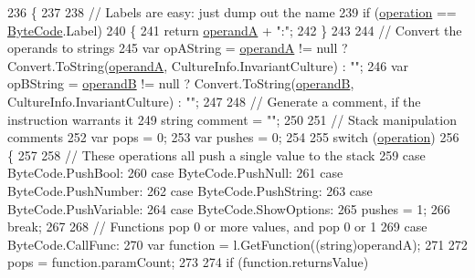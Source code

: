 \begin{DoxyCode}
236         \{
237 
238             \textcolor{comment}{// Labels are easy: just dump out the name}
239             \textcolor{keywordflow}{if} (\hyperlink{a00113_a566bf5f7198cc353ea5c3710cb3a31cb}{operation} == \hyperlink{a00048_ad5dfb6ee68ca7469623ad3e459f98894}{ByteCode}.Label)
240             \{
241                 \textcolor{keywordflow}{return} \hyperlink{a00113_ab5d386faa0d3dbc23db80f8e62706afd}{operandA} + \textcolor{stringliteral}{":"};
242             \}
243 
244             \textcolor{comment}{// Convert the operands to strings}
245             var opAString = \hyperlink{a00113_ab5d386faa0d3dbc23db80f8e62706afd}{operandA} != null ? Convert.ToString(\hyperlink{a00113_ab5d386faa0d3dbc23db80f8e62706afd}{operandA}, 
      CultureInfo.InvariantCulture) : \textcolor{stringliteral}{""};
246             var opBString = \hyperlink{a00113_a56348c6fe7eb919b7277afc06e5b224a}{operandB} != null ? Convert.ToString(\hyperlink{a00113_a56348c6fe7eb919b7277afc06e5b224a}{operandB}, 
      CultureInfo.InvariantCulture) : \textcolor{stringliteral}{""};
247 
248             \textcolor{comment}{// Generate a comment, if the instruction warrants it}
249             \textcolor{keywordtype}{string} comment = \textcolor{stringliteral}{""};
250 
251             \textcolor{comment}{// Stack manipulation comments}
252             var pops = 0;
253             var pushes = 0;
254 
255             \textcolor{keywordflow}{switch} (\hyperlink{a00113_a566bf5f7198cc353ea5c3710cb3a31cb}{operation})
256             \{
257 
258                 \textcolor{comment}{// These operations all push a single value to the stack}
259                 \textcolor{keywordflow}{case} ByteCode.PushBool:
260                 \textcolor{keywordflow}{case} ByteCode.PushNull:
261                 \textcolor{keywordflow}{case} ByteCode.PushNumber:
262                 \textcolor{keywordflow}{case} ByteCode.PushString:
263                 \textcolor{keywordflow}{case} ByteCode.PushVariable:
264                 \textcolor{keywordflow}{case} ByteCode.ShowOptions:
265                     pushes = 1;
266                     \textcolor{keywordflow}{break};
267 
268                 \textcolor{comment}{// Functions pop 0 or more values, and pop 0 or 1}
269                 \textcolor{keywordflow}{case} ByteCode.CallFunc:
270                     var \textcolor{keyword}{function} = l.GetFunction((string)operandA);
271 
272                     pops = function.paramCount;
273 
274                     \textcolor{keywordflow}{if} (\textcolor{keyword}{function}.returnsValue)

\end{DoxyCode}
